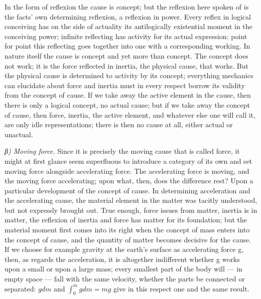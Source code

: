 \documentclass[12pt,a4paper]{book}
\newcommand{\subrunin}[1]{\emph{#1}\hspace{0.4em}}
\begin{document}
In the form of reflexion the cause is concept; but the reflexion here spoken of is the
facts' own determining reflexion, a reflexion in power. Every reflex in logical conceiving
has on the side of actuality its antilogically existential moment in the conceiving power;
infinite reflecting has activity for its actual expression: point for point this reflecting
goes together into one with a corresponding working. In nature itself the cause is concept
and yet more than concept. The concept does not work; it is the force reflected in inertia,
the physical cause, that works. But the physical cause is determined to activity by its
concept; everything mechanics can elucidate about force and inertia must in every respect
borrow its validity from the concept of cause. If we take away the active element in the
cause, then there is only a logical concept, no actual cause; but if we take away the
concept of cause, then force, inertia, the active element, and whatever else one will call
it, are only idle representations; there is then no cause at all, either actual or unactual.

\subrunin{β) Moving force.} Since it is precisely the moving cause that is called force, it
might at first glance seem superfluous to introduce a category of its own and set moving
force alongside accelerating force. The accelerating force is moving, and the moving force
accelerating; upon what, then, does the difference rest? Upon a particular development of
the concept of cause. In determining acceleration and the accelerating cause, the material
element in the matter was tacitly understood, but not expressly brought out. True enough,
force issues from matter, inertia is in matter, the reflexion of inertia and force has
matter for its foundation; but the material moment first comes into its right when the
concept of mass enters into the concept
of cause, and the quantity of matter becomes decisive for the cause. If we choose for
example gravity at the earth's surface as accelerating force g, then, as regards the
acceleration, it is altogether indifferent whether g works upon a small or upon a large
mass; every smallest part of the body will --- in empty space --- fall with the same
velocity, whether the parts be connected or separated: $gdm$ and $\int_{0}^{m} gdm = mg$
give in this respect one and the same result.
\end{document}
